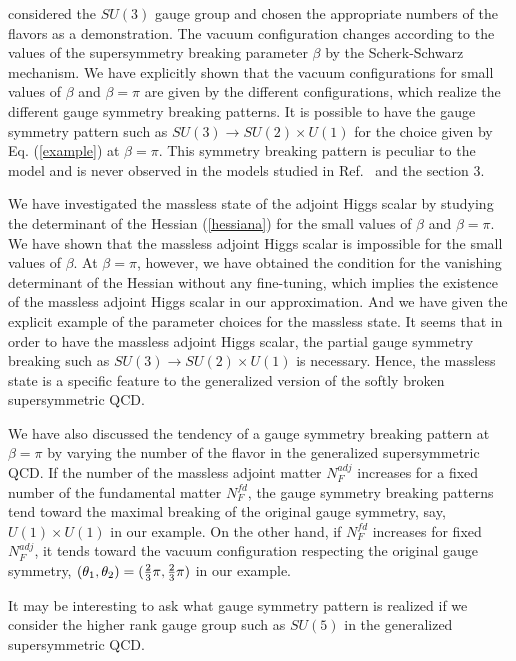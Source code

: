 \documentclass[a4paper,12pt]{article}
\begin{document}
{considered the $SU(3)$ gauge group and chosen the appropriate 
numbers of the flavors as a demonstration.
The vacuum configuration changes according to the values 
of the supersymmetry breaking parameter
$\beta$ by the Scherk-Schwarz mechanism. 
We have explicitly shown that the vacuum 
configurations for small values of $\beta$ and $\beta=\pi$ are given by
the different configurations, which realize the different gauge symmetry 
breaking patterns. It is possible to have the gauge 
symmetry pattern such as $SU(3)\rightarrow
SU(2)\times U(1)$ for the choice 
given by Eq. (\ref{example}) at $\beta=\pi$.
This symmetry breaking pattern is peculiar to the model and is never 
observed in the models studied 
in Ref.~\cite{takenagab} and the section $3$. 
\par
We have investigated the massless state of the adjoint Higgs scalar
by studying the determinant of the Hessian (\ref{hessiana}) for
the small values of $\beta$ and $\beta=\pi$.
We have shown that the massless adjoint Higgs scalar is 
impossible for the small values of $\beta$.
At $\beta=\pi$, however, we have obtained the condition for 
the vanishing determinant of the Hessian without 
any fine-tuning, which implies
the existence of the massless adjoint Higgs scalar in our approximation.
And we have given the explicit example of the parameter choices 
for the massless state. It seems that in order to have the massless 
adjoint Higgs scalar, the partial gauge symmetry breaking 
such as $SU(3)\rightarrow SU(2)\times U(1)$ is necessary. Hence, the 
massless state is a specific feature to the 
generalized version of the softly broken supersymmetric QCD.
\par
We have also discussed the tendency of a gauge symmetry breaking pattern
at $\beta=\pi$ by varying the number of the flavor in 
the generalized supersymmetric QCD. 
If the number of the massless 
adjoint matter $N_F^{adj}$ increases for a 
fixed number of the fundamental matter $N_F^{fd}$, the gauge symmetry 
breaking patterns tend toward the maximal breaking 
of the original gauge symmetry, say, $U(1)\times U(1)$ in our example.
On the other hand, if $N_F^{fd}$ increases for fixed 
$N_F^{adj}$, it tends toward the vacuum configuration respecting the
original gauge symmetry, $(\theta_1,\theta_2)=
({2\over 3}\pi, {2\over 3}\pi)$ in our example. 
\par
It may be interesting to ask what gauge symmetry pattern is realized if we 
consider the higher rank gauge group such as $SU(5)$ in the 
generalized supersymmetric QCD. 
}
\end{document}
